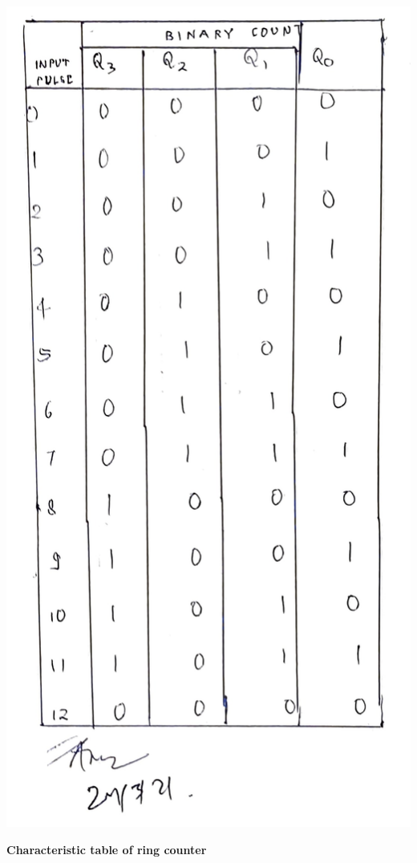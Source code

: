 \begin{center}
    \includegraphics[scale = 0.1]{Figures/tabmod12_1.jpg}
\end{center}
\begin{center}
    \textbf{Characteristic table of ring counter}
\end{center}

